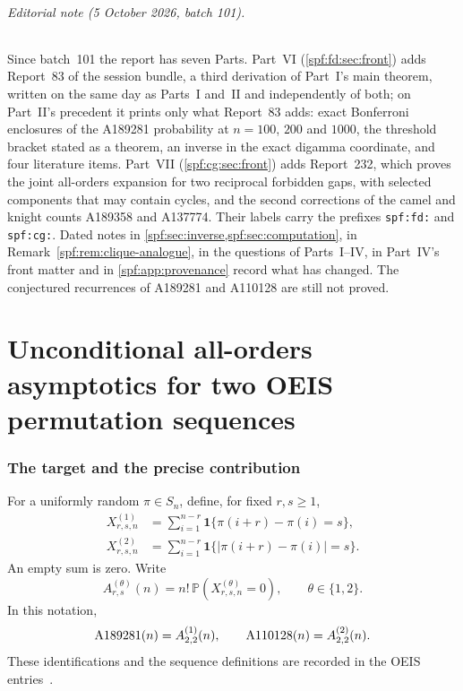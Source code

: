 \documentclass[11pt]{article}
\numberwithin{equation}{section}
\theoremstyle{definition}
\theoremstyle{remark}
\theoremstyle{definition}
\newcommand{\Pp}{\mathbb P}
\newcommand{\ind}{\mathbf 1}
\newcommand{\Aone}{\textnormal{A189281}}
\newcommand{\Atwo}{\textnormal{A110128}}
\begin{document}
\paragraph{Editorial note (5 October 2026, batch 101).}
Since batch~101 the report has seven Parts. Part~VI
(\cref{spf:fd:sec:front}) adds Report~83 of the session bundle, a third
derivation of Part~I's main theorem, written on the same day as Parts~I
and~II and independently of both; on Part~II's precedent it prints only
what Report~83 adds: exact Bonferroni enclosures of the A189281 probability
at $n=100$, $200$ and $1000$, the threshold bracket stated as a theorem, an
inverse in the exact digamma coordinate, and four literature items.
Part~VII (\cref{spf:cg:sec:front}) adds Report~232, which proves the joint
all-orders expansion for two reciprocal forbidden gaps, with selected
components that may contain cycles, and the second corrections of the camel
and knight counts A189358 and A137774. Their labels carry the prefixes
\texttt{spf:fd:} and \texttt{spf:cg:}. Dated notes in
\cref{spf:sec:inverse,spf:sec:computation}, in
Remark~\ref{spf:rem:clique-analogue}, in the questions of
Parts~I--IV, in Part~IV's front matter and in \cref{spf:app:provenance}
record what has changed. The conjectured recurrences of A189281 and A110128
are still not proved.

\newpage
\tableofcontents
\newpage

\part{Unconditional all-orders asymptotics for two OEIS permutation sequences}

\section{The target and the precise contribution}
\label{spf:sec:target}

For a uniformly random $\pi\in S_n$, define, for fixed $r,s\ge1$,
\begin{align}
 X^{(1)}_{r,s,n}
   &=\sum_{i=1}^{n-r}\ind\{\pi(i+r)-\pi(i)=s\},\\
 X^{(2)}_{r,s,n}
   &=\sum_{i=1}^{n-r}\ind\{|\pi(i+r)-\pi(i)|=s\}.
\end{align}
An empty sum is zero. Write
\begin{equation}
 A^{(\theta)}_{r,s}(n)=n!\,\Pp(X^{(\theta)}_{r,s,n}=0),
 \qquad \theta\in\{1,2\}.
 \label{spf:eq:counts}
\end{equation}
In this notation,
\begin{equation}
 \Aone(n)=A^{(1)}_{2,2}(n),\qquad
 \Atwo(n)=A^{(2)}_{2,2}(n).
\end{equation}
These identifications and the sequence definitions are recorded in the OEIS
entries~\cite{oeis189281,oeis110128}.
\end{document}
